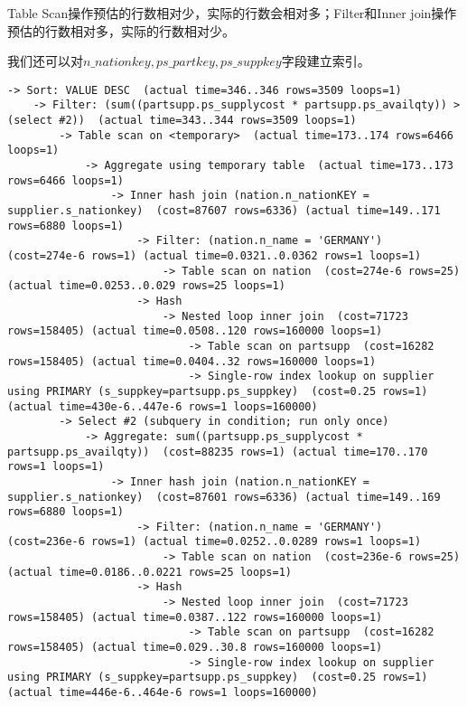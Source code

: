 \documentclass{article}
\begin{document}
Table Scan操作预估的行数相对少，实际的行数会相对多；Filter和Inner join操作预估的行数相对多，实际的行数相对少。

我们还可以对$n\_nationkey,ps\_partkey,ps\_suppkey$字段建立索引。

\begin{lstlisting}
-> Sort: VALUE DESC  (actual time=346..346 rows=3509 loops=1)
    -> Filter: (sum((partsupp.ps_supplycost * partsupp.ps_availqty)) > (select #2))  (actual time=343..344 rows=3509 loops=1)
        -> Table scan on <temporary>  (actual time=173..174 rows=6466 loops=1)
            -> Aggregate using temporary table  (actual time=173..173 rows=6466 loops=1)
                -> Inner hash join (nation.n_nationKEY = supplier.s_nationkey)  (cost=87607 rows=6336) (actual time=149..171 rows=6880 loops=1)
                    -> Filter: (nation.n_name = 'GERMANY')  (cost=274e-6 rows=1) (actual time=0.0321..0.0362 rows=1 loops=1)
                        -> Table scan on nation  (cost=274e-6 rows=25) (actual time=0.0253..0.029 rows=25 loops=1)
                    -> Hash
                        -> Nested loop inner join  (cost=71723 rows=158405) (actual time=0.0508..120 rows=160000 loops=1)
                            -> Table scan on partsupp  (cost=16282 rows=158405) (actual time=0.0404..32 rows=160000 loops=1)
                            -> Single-row index lookup on supplier using PRIMARY (s_suppkey=partsupp.ps_suppkey)  (cost=0.25 rows=1) (actual time=430e-6..447e-6 rows=1 loops=160000)
        -> Select #2 (subquery in condition; run only once)
            -> Aggregate: sum((partsupp.ps_supplycost * partsupp.ps_availqty))  (cost=88235 rows=1) (actual time=170..170 rows=1 loops=1)
                -> Inner hash join (nation.n_nationKEY = supplier.s_nationkey)  (cost=87601 rows=6336) (actual time=149..169 rows=6880 loops=1)
                    -> Filter: (nation.n_name = 'GERMANY')  (cost=236e-6 rows=1) (actual time=0.0252..0.0289 rows=1 loops=1)
                        -> Table scan on nation  (cost=236e-6 rows=25) (actual time=0.0186..0.0221 rows=25 loops=1)
                    -> Hash
                        -> Nested loop inner join  (cost=71723 rows=158405) (actual time=0.0387..122 rows=160000 loops=1)
                            -> Table scan on partsupp  (cost=16282 rows=158405) (actual time=0.029..30.8 rows=160000 loops=1)
                            -> Single-row index lookup on supplier using PRIMARY (s_suppkey=partsupp.ps_suppkey)  (cost=0.25 rows=1) (actual time=446e-6..464e-6 rows=1 loops=160000)
\end{lstlisting}
\end{document}
